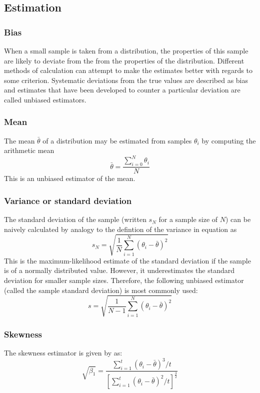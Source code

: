 \subsection{Estimation}
\subsubsection{Bias}
When a small sample is taken from a distribution, the properties of this sample are likely to deviate from the from the properties of the distribution.
Different methods of calculation can attempt to make the estimates better with regards to some criterion.
Systematic deviations from the true values are described as bias and estimates that have been developed to counter a particular deviation are called unbiased estimators.

\subsubsection{Mean}
The mean $\bar{\theta}$ of a distribution may be estimated from samples $\theta_i$ by computing the arithmetic mean
\begin{equation}
  \label{eq:mean}
  \bar{\theta} = \frac{\displaystyle \sum_{i=0}^N \theta_i}{N}
\end{equation}
This is an unbiased estimator of the mean.

\subsubsection{Variance or standard deviation}
The standard deviation of the sample (written $s_N$ for a sample size of $N$) can be naively calculated by analogy to the defintion of the variance in equation  as
\begin{equation}
  \label{eq:standardeviationsample}
  s_N = \sqrt{\frac{1}{N}\sum_{i=1}^N(\theta_i-\bar{\theta})^2}
\end{equation}
This is the maximum-likelihood estimate of the standard deviation if the sample is of a normally distributed value.
However, it underestimates the standard deviation for smaller sample sizes.
Therefore, the following unbiased estimator (called the sample standard deviation) is most commonly used:
\begin{equation}
  \label{eq:samplestandardeviation}
  s = \sqrt{\frac{1}{N-1}\sum_{i=1}^N(\theta_i-\bar{\theta})^2}
\end{equation}

\subsubsection{Skewness}
The skewness estimator is given by \citet{mooney1997monte} as:
\begin{equation} 
  \sqrt{\beta_1} =
  \frac{\displaystyle\sum_{i=1}^t \left ( \theta_i - \bar{\theta} \right
    )^3/t} { \left [ \displaystyle\sum_{i=1}^t \left (
        \theta_i-\bar{\theta} \right )^2/t \right ]^\frac{3}{2}} 
\end{equation}

